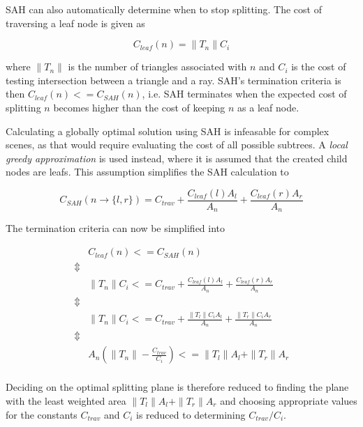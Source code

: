 
SAH can also automatically determine when to stop splitting. The cost
of traversing a leaf node is given as

\begin{displaymath}
  C_{leaf}(n) = \|T_n\| C_i
\end{displaymath}

where $\|T_n\|$ is the number of triangles associated with $n$ and $C_i$ is the
cost of testing intersection between a triangle and a ray. SAH's termination
criteria is then $C_{leaf}(n) <= C_{SAH}(n)$, i.e. SAH terminates when the
expected cost of splitting $n$ becomes higher than the cost of keeping $n$ as a
leaf node.

Calculating a globally optimal solution using SAH is infeasable for complex
scenes, as that would require evaluating the cost of all possible subtrees. A
\textit{local greedy approximation} is used instead, where it is assumed that
the created child nodes are leafs. This assumption simplifies the SAH
calculation to

\begin{displaymath}
  C_{SAH}(n \rightarrow \{l, r\}) = C_{trav} + \frac{C_{leaf}(l) A_l}{A_n}
  + \frac{C_{leaf}(r) A_r}{A_n}
\end{displaymath}

The termination criteria can now be simplified into

\begin{displaymath}
  \begin{array}{rl}
    & C_{leaf}(n) <= C_{SAH}(n)\\
    \Updownarrow \\
    & \|T_n\| C_i <= C_{trav} + \frac{C_{leaf}(l) A_l}{A_n} + \frac{C_{leaf}(r)
      A_r}{A_n} \\
    \Updownarrow \\
    & \|T_n\| C_i <= C_{trav} + \frac{\|T_l\| C_i A_l}{A_n} + \frac{\|T_r\| C_i A_r}{A_n}\\
    \Updownarrow \\
    & A_n (\|T_n\| - \frac{C_{trav}}{C_i}) <=  \|T_l\| A_l + \|T_r\| A_r\\
  \end{array}
\end{displaymath}

Deciding on the optimal splitting plane is therefore reduced to finding the
plane with the least weighted area $\|T_l\| A_l + \|T_r\| A_r$ and choosing
appropriate values for the constants $C_{trav}$ and $C_i$ is reduced to
determining $C_{trav}/C_i$.

